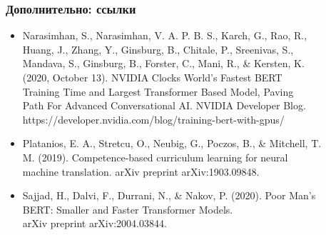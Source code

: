 \documentclass{beamer}
\begin{document}
\begin{frame}[label=supplemental,noframenumbering]
	\frametitle{Дополнительно: ссылки}
	\begin{itemize}
		\item Narasimhan, S., Narasimhan, V. A. P. B. S., Karch, G., Rao, R., \\\hspace{1cm}Huang, J., Zhang, Y.,
		Ginsburg, B., Chitale, P., Sreenivas, S., \\\hspace{1cm}Mandava, S., Ginsburg, B., Forster, C., Mani,
		R., \& Kersten, K. \\\hspace{1cm}(2020, October 13). NVIDIA Clocks World’s Fastest BERT \\\hspace{1cm}Training
		Time and Largest Transformer Based Model, Paving \\\hspace{1cm}Path For Advanced
		Conversational AI. NVIDIA Developer Blog.
		\\\hspace{1cm}https://developer.nvidia.com/blog/training-bert-with-gpus/
		\item Platanios, E. A., Stretcu, O., Neubig, G., Poczos, B., \& Mitchell, T. \\\hspace{1cm}M. (2019).
		Competence-based curriculum learning for neural \\\hspace{1cm}machine translation. arXiv preprint
		arXiv:1903.09848.
		\item Sajjad, H., Dalvi, F., Durrani, N., \& Nakov, P. (2020). Poor Man's \\\hspace{1cm}BERT: Smaller and Faster
		Transformer Models. \\\hspace{1cm}arXiv preprint arXiv:2004.03844.
	\end{itemize}
\end{frame}
\end{document}
